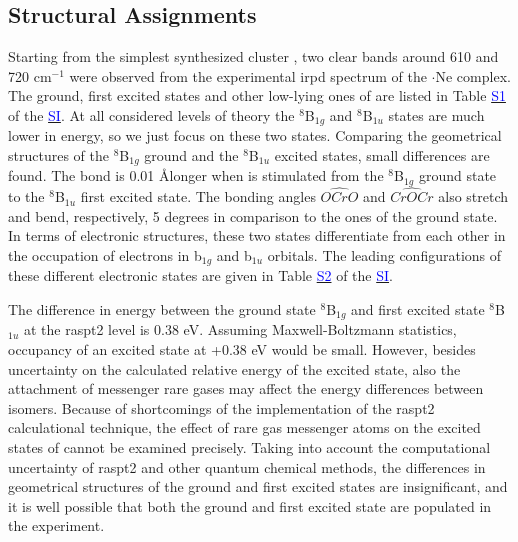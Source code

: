 \begin{refsection}
\subsection{Structural Assignments} 



Starting from the simplest synthesized cluster , two clear bands around 610 and 720 cm$^{-1}$ were observed from the experimental \acrshort{irpd} spectrum of the $\boldsymbol{\cdot}$Ne complex. The ground, first excited states and other low-lying ones of  are listed in Table \href{https://pubs.acs.org/doi/suppl/10.1021/acs.jpcc.8b10035/suppl_file/jp8b10035_si_002.pdf}{\textcolor{blue}{S1}} of the \href{https://pubs.acs.org/doi/suppl/10.1021/acs.jpcc.8b10035/suppl_file/jp8b10035_si_002.pdf}{\textcolor{blue}{SI}}. At all considered levels of theory the $^8$B$_{1g}$ and $^8$B$_{1u}$ states are much lower in energy, so we just focus on these two states. Comparing the geometrical structures of the $^8$B$_{1g}$ ground and the $^8$B$_{1u}$ excited states, small differences are found. The  bond is 0.01 \AA\space longer when  is stimulated from the $^8$B$_{1g}$ ground state to the $^8$B$_{1u}$ first excited state. The bonding angles $\widehat{OCrO}$ and $\widehat{CrOCr}$ also stretch and bend, respectively, 5 degrees in comparison to the ones of the ground state. In terms of electronic structures, these two states differentiate from each other in the occupation of electrons in b$_{1g}$ and b$_{1u}$ orbitals. The leading configurations of these different electronic states are given in Table \href{https://pubs.acs.org/doi/suppl/10.1021/acs.jpcc.8b10035/suppl_file/jp8b10035_si_002.pdf}{\textcolor{blue}{S2}} of the \href{https://pubs.acs.org/doi/suppl/10.1021/acs.jpcc.8b10035/suppl_file/jp8b10035_si_002.pdf}{\textcolor{blue}{SI}}. 




The difference in energy between the ground state $^8$B$_{1g}$ and first excited state $^8$B$_{1u}$ at the \acrshort{raspt2} level is 0.38 eV. Assuming Maxwell-Boltzmann statistics, occupancy of an excited state at +0.38 eV would be small. However, besides uncertainty on the calculated relative energy of the excited state, also the attachment of messenger rare gases may affect the energy differences between isomers. Because of shortcomings of the implementation of the \acrshort{raspt2} calculational technique, the effect of rare gas messenger atoms on the excited states of  cannot be examined precisely. Taking into account the computational uncertainty of \acrshort{raspt2} and other quantum chemical methods, the differences in geometrical structures of the ground and first excited states are insignificant, and it is well possible that both the ground and first excited state are populated in the experiment. 





\end{refsection}

